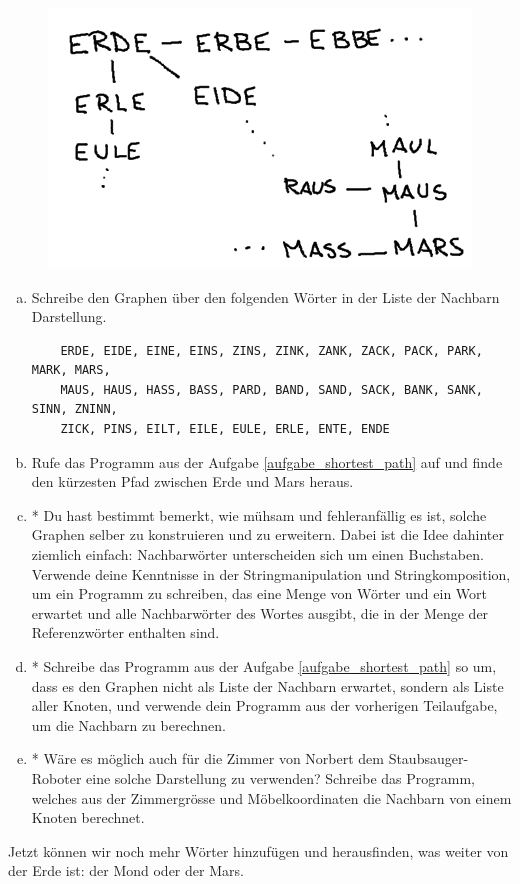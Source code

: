 \begin{figure}[H]
    \centering
    \includegraphics[width=\textwidth]{Pictures/SP/erde_mars_first_graph.png}
\end{figure}

\begin{aufgabe}\label{aufgabe_erde_mars_neighbours}
\begin{enumerate}[(a)]
    \item Schreibe den Graphen über den folgenden Wörter in der Liste der Nachbarn Darstellung.
    \begin{lstlisting}
    ERDE, EIDE, EINE, EINS, ZINS, ZINK, ZANK, ZACK, PACK, PARK, MARK, MARS,
    MAUS, HAUS, HASS, BASS, PARD, BAND, SAND, SACK, BANK, SANK, SINN, ZNINN,
    ZICK, PINS, EILT, EILE, EULE, ERLE, ENTE, ENDE
    \end{lstlisting}
    \item Rufe das Programm aus der Aufgabe \ref{aufgabe_shortest_path} auf und finde den kürzesten Pfad zwischen Erde und Mars heraus.
    \item * Du hast bestimmt bemerkt, wie mühsam und fehleranfällig es ist, solche Graphen selber zu konstruieren und zu erweitern. Dabei ist die Idee dahinter ziemlich einfach: Nachbarwörter unterscheiden sich um einen Buchstaben. Verwende deine Kenntnisse in der Stringmanipulation und Stringkomposition, um ein Programm zu schreiben, das eine Menge von Wörter und ein Wort erwartet und alle Nachbarwörter des Wortes ausgibt, die in der Menge der Referenzwörter enthalten sind.
    \item * Schreibe das Programm aus der Aufgabe \ref{aufgabe_shortest_path} so um, dass es den Graphen nicht als Liste der Nachbarn erwartet, sondern als Liste aller Knoten, und verwende dein Programm aus der vorherigen Teilaufgabe, um die Nachbarn zu berechnen.
    \item * Wäre es möglich auch für die Zimmer von Norbert dem Staubsauger-Roboter eine solche Darstellung zu verwenden? Schreibe das Programm, welches aus der Zimmergrösse und Möbelkoordinaten die Nachbarn von einem Knoten berechnet.
\end{enumerate}
\end{aufgabe}
Jetzt können wir noch mehr Wörter hinzufügen und herausfinden, was weiter von der Erde ist: der Mond oder der Mars.

